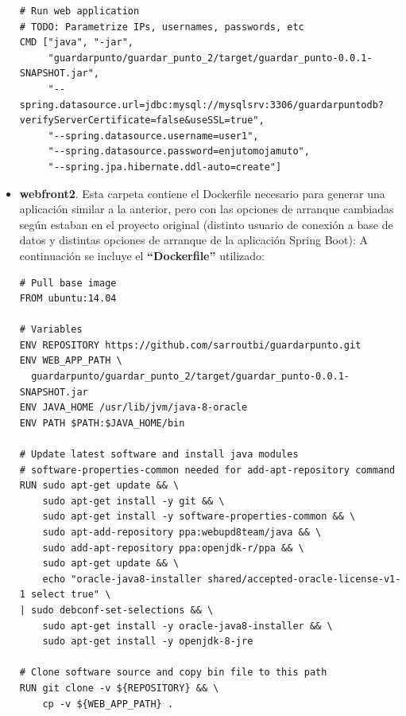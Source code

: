 \documentclass[12pt,spanish]{article}
\begin{document}
\begin{itemize}
\begin{verbatim}
# Run web application
# TODO: Parametrize IPs, usernames, passwords, etc
CMD ["java", "-jar",
     "guardarpunto/guardar_punto_2/target/guardar_punto-0.0.1-SNAPSHOT.jar",
     "--spring.datasource.url=jdbc:mysql://mysqlsrv:3306/guardarpuntodb?
verifyServerCertificate=false&useSSL=true",
     "--spring.datasource.username=user1",
     "--spring.datasource.password=enjutomojamuto",
     "--spring.jpa.hibernate.ddl-auto=create"]
\end{verbatim}
\item{\textbf{webfront2}}. Esta carpeta contiene el Dockerfile necesario para generar una aplicación similar a la anterior, pero con las opciones de arranque cambiadas según estaban en el proyecto original (distinto usuario de conexión a base de datos y distintas opciones de arranque de la aplicación Spring Boot):
A continuación se incluye el \textbf{``Dockerfile''} utilizado:
\begin{verbatim}
# Pull base image
FROM ubuntu:14.04

# Variables
ENV REPOSITORY https://github.com/sarroutbi/guardarpunto.git
ENV WEB_APP_PATH \
  guardarpunto/guardar_punto_2/target/guardar_punto-0.0.1-SNAPSHOT.jar
ENV JAVA_HOME /usr/lib/jvm/java-8-oracle
ENV PATH $PATH:$JAVA_HOME/bin

# Update latest software and install java modules
# software-properties-common needed for add-apt-repository command
RUN sudo apt-get update && \
    sudo apt-get install -y git && \
    sudo apt-get install -y software-properties-common && \
    sudo apt-add-repository ppa:webupd8team/java && \
    sudo add-apt-repository ppa:openjdk-r/ppa && \
    sudo apt-get update && \
    echo "oracle-java8-installer shared/accepted-oracle-license-v1-1 select true" \
| sudo debconf-set-selections && \
    sudo apt-get install -y oracle-java8-installer && \
    sudo apt-get install -y openjdk-8-jre

# Clone software source and copy bin file to this path
RUN git clone -v ${REPOSITORY} && \
    cp -v ${WEB_APP_PATH} .


\end{verbatim}
\end{itemize}
\end{document}
